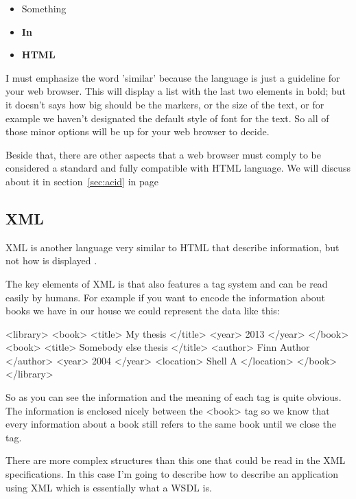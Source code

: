 \documentclass[a4paper,10pt]{article}
\begin{document}
  \begin{itemize}
    \item Something
    \item \textbf{In}
    \item \textbf{HTML}
  \end{itemize}

  I must emphasize the word 'similar' because the language is just a guideline for your web browser. This will display a list with the last two elements in bold; but it doesn't says how big should be the markers, or the size of the text, or for example we haven't designated the default style of font for the text. So all of those minor options will be up for your web browser to decide.\vspace{3 mm}

  Beside that, there are other aspects that a web browser must comply to be considered a standard and fully compatible with HTML language. We will discuss about it in section~\ref{sec:acid} in page ~\pageref{sec:acid}

  \subsection{XML}

  XML is another language very similar to HTML that describe information, but not how is displayed \cite{xml}.\vspace{3 mm}

  The key elements of XML is that also features a tag system and can be read easily by humans. For example if you want to encode the information about books we have in our house we could represent the data like this:\vspace{3 mm}

  <library>
  <book>
  <title> My thesis </title>
  <year> 2013 </year>
  </book>
  <book>
  <title> Somebody else thesis </title>
  <author> Finn Author </author>
  <year> 2004 </year>
  <location> Shell A </location>
  </book>
  </library>

  So as you can see the information and the meaning of each tag is quite obvious. The information is enclosed nicely between the <book> tag so we know that every information about a book still refers to the same book until we close the tag.\vspace{3 mm}

  There are more complex structures than this one that could be read in the XML specifications. In this case I'm going to describe how to describe an application using XML which is essentially what a WSDL is.\vspace{3 mm}
\end{document}
